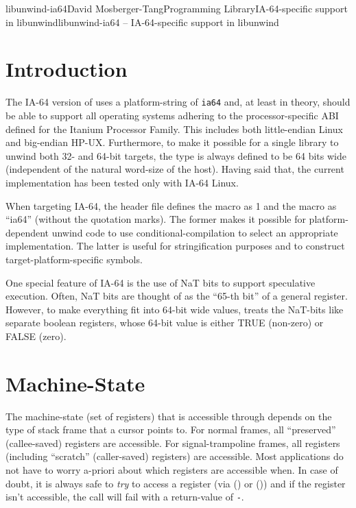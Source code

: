 \documentclass{article}
\begin{document}
\begin{Name}{3}{libunwind-ia64}{David Mosberger-Tang}{Programming Library}{IA-64-specific support in libunwind}libunwind-ia64 -- IA-64-specific support in libunwind
\end{Name}


\section{Introduction}

The IA-64 version of  uses a platform-string of
\texttt{ia64} and, at least in theory, should be able to support all
operating systems adhering to the processor-specific ABI defined for
the Itanium Processor Family.  This includes both little-endian Linux
and big-endian HP-UX.  Furthermore, to make it possible for a single
library to unwind both 32- and 64-bit targets, the type
 is always defined to be 64 bits wide (independent
of the natural word-size of the host).  Having said that, the current
implementation has been tested only with IA-64 Linux.

When targeting IA-64, the  header file defines the
macro  as 1 and the macro 
as ``ia64'' (without the quotation marks).  The former makes it
possible for platform-dependent unwind code to use
conditional-compilation to select an appropriate implementation.  The
latter is useful for stringification purposes and to construct
target-platform-specific symbols.

One special feature of IA-64 is the use of NaT bits to support
speculative execution.  Often, NaT bits are thought of as the ``65-th
bit'' of a general register.  However, to make everything fit into
64-bit wide  values,  treats the
NaT-bits like separate boolean registers, whose 64-bit value is either
TRUE (non-zero) or FALSE (zero).


\section{Machine-State}

The machine-state (set of registers) that is accessible through
 depends on the type of stack frame that a cursor
points to.  For normal frames, all ``preserved'' (callee-saved)
registers are accessible.  For signal-trampoline frames, all registers
(including ``scratch'' (caller-saved) registers) are accessible.  Most
applications do not have to worry a-priori about which registers are
accessible when.  In case of doubt, it is always safe to \emph{try} to
access a register (via () or
()) and if the register isn't accessible, the
call will fail with a return-value of \texttt{-}.
\end{document}

